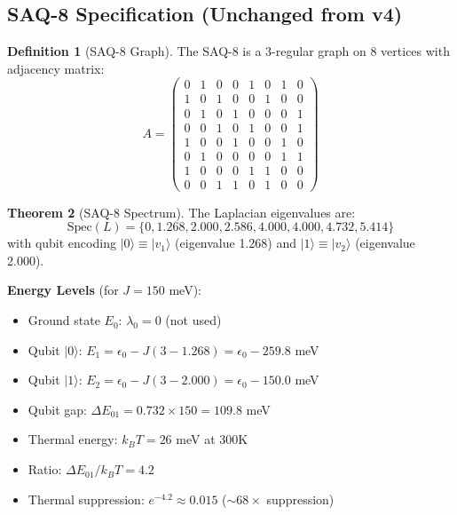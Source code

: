 \documentclass[11pt,a4paper]{article}
\theoremstyle{definition}
\newtheorem{theorem}{Theorem}[section]
\newtheorem{definition}[theorem]{Definition}
\newcommand{\ket}[1]{|#1\rangle}
\begin{document}
\subsection{SAQ-8 Specification (Unchanged from v4)}

\begin{definition}[SAQ-8 Graph]
The SAQ-8 is a 3-regular graph on 8 vertices with adjacency matrix:
\begin{equation}
A = \begin{pmatrix}
0 & 1 & 0 & 0 & 1 & 0 & 1 & 0 \\
1 & 0 & 1 & 0 & 0 & 1 & 0 & 0 \\
0 & 1 & 0 & 1 & 0 & 0 & 0 & 1 \\
0 & 0 & 1 & 0 & 1 & 0 & 0 & 1 \\
1 & 0 & 0 & 1 & 0 & 0 & 1 & 0 \\
0 & 1 & 0 & 0 & 0 & 0 & 1 & 1 \\
1 & 0 & 0 & 0 & 1 & 1 & 0 & 0 \\
0 & 0 & 1 & 1 & 0 & 1 & 0 & 0
\end{pmatrix}
\end{equation}
\end{definition}

\begin{theorem}[SAQ-8 Spectrum]
The Laplacian eigenvalues are:
\begin{equation}
\text{Spec}(L) = \{0, 1.268, 2.000, 2.586, 4.000, 4.000, 4.732, 5.414\}
\end{equation}
with qubit encoding $\ket{0} \equiv \ket{v_1}$ (eigenvalue 1.268) and $\ket{1} \equiv \ket{v_2}$ (eigenvalue 2.000).
\end{theorem}

\begin{engineering}
\textbf{Energy Levels} (for $J = 150$ meV):
\begin{itemize}[noitemsep]
    \item Ground state $E_0$: $\lambda_0 = 0$ (not used)
    \item Qubit $\ket{0}$: $E_1 = \epsilon_0 - J(3 - 1.268) = \epsilon_0 - 259.8$ meV
    \item Qubit $\ket{1}$: $E_2 = \epsilon_0 - J(3 - 2.000) = \epsilon_0 - 150.0$ meV
    \item Qubit gap: $\Delta E_{01} = 0.732 \times 150 = 109.8$ meV
    \item Thermal energy: $k_BT = 26$ meV at 300K
    \item Ratio: $\Delta E_{01}/k_BT = 4.2$
    \item Thermal suppression: $e^{-4.2} \approx 0.015$ ($\sim 68\times$ suppression)
\end{itemize}
\end{engineering}
\end{document}
